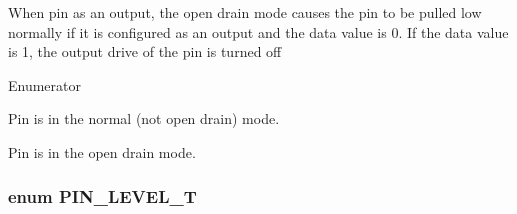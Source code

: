 When pin as an output, the open drain mode causes the pin to be pulled low normally if it is configured as an output and the data value is 0. If the data value is 1, the output drive of the pin is turned off \begin{Desc}
\item[Enumerator]\par
\begin{description}
\item[{\em 
\hypertarget{group___enumerations_ggac16e35b75166ad7286b8bb78bd244ed2afd68b1a66f2a33ce77d4f6c7f8fc998a}{N\-O\-T\-\_\-\-O\-P\-E\-N}\label{group___enumerations_ggac16e35b75166ad7286b8bb78bd244ed2afd68b1a66f2a33ce77d4f6c7f8fc998a}
}]Pin is in the normal (not open drain) mode. \item[{\em 
\hypertarget{group___enumerations_ggac16e35b75166ad7286b8bb78bd244ed2aa90b62c376675b218528e2b0b0a7f123}{O\-P\-E\-N\-\_\-\-D\-R\-A\-I\-N}\label{group___enumerations_ggac16e35b75166ad7286b8bb78bd244ed2aa90b62c376675b218528e2b0b0a7f123}
}]Pin is in the open drain mode. \end{description}
\end{Desc}
\hypertarget{group___enumerations_ga6f24594071a026b31238ab8cb80d6a80}{
\subsubsection[{P\-I\-N\-\_\-\-L\-E\-V\-E\-L\-\_\-\-T}]{\setlength{\rightskip}{0pt plus 5cm}enum {\bf P\-I\-N\-\_\-\-L\-E\-V\-E\-L\-\_\-\-T}}}\label{group___enumerations_ga6f24594071a026b31238ab8cb80d6a80}

